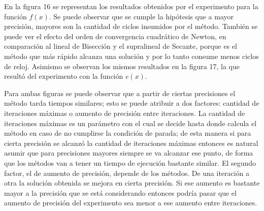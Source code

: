 En la figura 16 se representan los resultados obtenidos por el experimento para la funci\'on $f(x)$. Se puede observar que se cumple la hip\'otesis que a mayor precisi\'on, mayores son la cantidad de ciclos insumidos por el m\'etodo. Tambi\'en se puede ver el efecto del orden de convergencia cuadr\'atico de Newton, en comparaci\'on al lineal de Bisecci\'on y el supralineal de Secante, porque es el m\'etodo que m\'as r\'apido alcanza una soluci\'on y por lo tanto consume menos ciclos de reloj. Asimismo se observan los mismos resultados en la figura 17, la que result\'o del experimento con la funci\'on $e(x)$.


Para ambas figuras se puede observar que a partir de ciertas precisiones el m\'etodo tarda tiempos similares; esto se puede atribuir a dos factores: cantidad de iteraciones m\'aximas o aumento de precisi\'on entre iteraciones. La cantidad de iteraciones m\'aximas es un par\'ametro con el cual se decide hasta donde calcula el m\'etodo en caso de no cumplirse la condici\'on de parada; de esta manera si para cierta precisi\'on se alcanz\'o la cantidad de iteraciones m\'aximas entonces es natural asumir que para precisiones mayores siempre se va alcanzar ese punto, de forma que los m\'etodos van a tener un tiempo de ejecuci\'on bastante similar. El segundo factor, el de aumento de precisi\'on, depende de los m\'etodos. De una iteraci\'on a otra la soluci\'on obtenida se mejora en cierta precisi\'on. Si ese aumento es bastante mayor a la precisi\'on que se est\'a considerando entonces podr\'ia pasar que el aumento de precisi\'on del experimento sea menor a ese aumento entre iteraciones.
 
